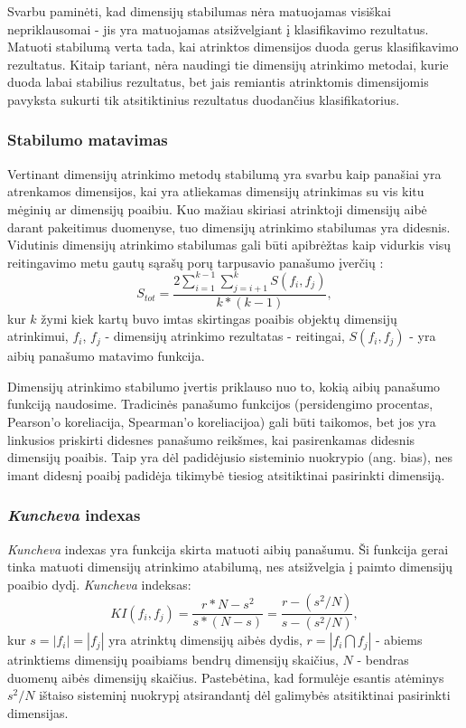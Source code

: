 Svarbu paminėti, kad dimensijų stabilumas nėra matuojamas visiškai nepriklausomai - jis yra matuojamas atsižvelgiant į klasifikavimo rezultatus. Matuoti stabilumą verta tada, kai atrinktos dimensijos duoda gerus klasifikavimo rezultatus. Kitaip tariant, nėra naudingi tie dimensijų atrinkimo metodai, kurie duoda labai stabilius rezultatus, bet jais remiantis atrinktomis dimensijomis pavyksta sukurti tik atsitiktinius rezultatus duodančius klasifikatorius.

\subsubsection{Stabilumo matavimas}

Vertinant dimensijų atrinkimo metodų stabilumą yra svarbu kaip panašiai yra atrenkamos dimensijos, kai yra atliekamas dimensijų atrinkimas su vis kitu mėginių ar dimensijų poaibiu. Kuo mažiau skiriasi atrinktoji dimensijų aibė darant pakeitimus duomenyse, tuo dimensijų atrinkimo stabilumas yra didesnis. Vidutinis dimensijų atrinkimo stabilumas gali būti apibrėžtas kaip vidurkis visų reitingavimo metu gautų sąrašų porų tarpusavio panašumo įverčių \cite{kalousis2007stability}:
\begin{equation}
 S_{tot}=\frac{2\sum_{i=1}^{k-1}\sum_{j=i+1}^{k} S(f_i, f_j)}{k*(k-1)},
\end{equation} 
kur $k$ žymi kiek kartų buvo imtas skirtingas poaibis objektų dimensijų atrinkimui,
$f_i$, $f_j$ - dimensijų atrinkimo rezultatas - reitingai, 
$S(f_i, f_j)$ - yra aibių panašumo matavimo funkcija.

Dimensijų atrinkimo stabilumo įvertis priklauso nuo to, kokią aibių panašumo funkciją naudosime. Tradicinės panašumo funkcijos (persidengimo procentas, Pearson'o koreliacija, Spearman'o koreliacijoa) gali būti taikomos, bet jos yra linkusios priskirti didesnes panašumo reikšmes, kai pasirenkamas didesnis dimensijų poaibis. Taip yra dėl padidėjusio sisteminio nuokrypio (ang. bias), nes imant didesnį poaibį padidėja tikimybė tiesiog atsitiktinai pasirinkti dimensiją.

\subsubsection{\textit{Kuncheva} indexas}

\textit{Kuncheva} indexas \cite{DBLP:conf/aia/Kuncheva07} yra funkcija skirta matuoti aibių panašumu. Ši funkcija gerai tinka matuoti dimensijų atrinkimo atabilumą, nes atsižvelgia į paimto dimensijų poaibio dydį. \textit{Kuncheva} indeksas:
\begin{equation}
\label{kuncheva_index}
 KI(f_i, f_j)=\frac{r*N - s^2}{s*(N-s)}=\frac{r - (s^2/N)}{s - (s^2/N)},
\end{equation}		
kur $s=|f_i|=|f_j|$ yra atrinktų dimensijų aibės dydis, $r=|f_i \bigcap f_j|$ - abiems atrinktiems dimensijų poaibiams bendrų dimensijų skaičius, $N$ - bendras  duomenų aibės dimensijų skaičius. Pastebėtina, kad formulėje esantis atėminys $s^2/N$ ištaiso sisteminį nuokrypį atsirandantį dėl galimybės atsitiktinai pasirinkti dimensijas. 

